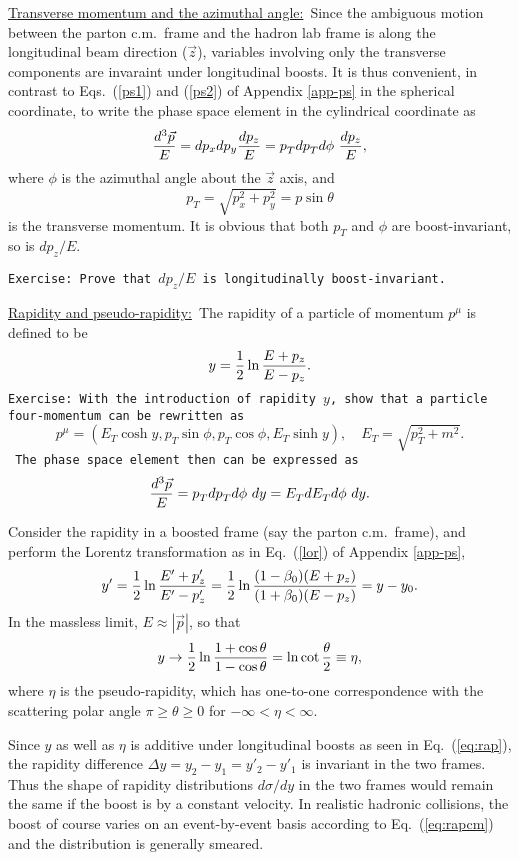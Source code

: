 \documentclass[prd,aps,floats,preprintnumbers,preprint,superscriptaddress,floatfix,nofootinbib]{revtex4}
\def\vp{{\vec p}}
\def\pt{p_T^{}}
\def\et{E_T^{}}
\def\be{\begin{equation}}
\def\ee{\end{equation}}
\begin{document}
\vskip 0.2cm
\noindent
\underline{Transverse momentum and the azimuthal angle:}\  Since the 
ambiguous motion between the parton c.m.~frame and the 
hadron lab frame is along
the longitudinal beam direction ($\vec z$), variables involving only
the transverse components are invaraint under longitudinal  boosts. It is thus
convenient, in contrast to Eqs.~(\ref{ps1})  and (\ref{ps2}) of Appendix \ref{app-ps} 
in the spherical coordinate,
 to write the phase space element in the cylindrical coordinate as
\be
{d^3\vec p\over E} = d p_x d p_y {d p_z\over E}  =  \pt d\pt d\phi\  {d p_z\over E} ,
\ee
where $\phi$ is the azimuthal angle about the $\vec z$ axis, and 
\be
\pt = \sqrt{p_x^2 + p_y^2} = p \sin\theta
\ee
 is the transverse momentum. It is obvious
that both $\pt$ and $\phi$ are  boost-invariant, so is $dp_z/E$.

\noindent
{\tt Exercise: Prove that $dp_z/E$ is longitudinally boost-invariant.}


\vskip 0.2cm
\noindent
\underline{Rapidity and pseudo-rapidity:}\  The rapidity of  a particle of momentum
$p^\mu$ is defined to be
\be
y = {1\over 2} \ln{E+p_z \over E - p_z }.
\ee
{\tt Exercise: With the introduction of  rapidity $y$, show that a particle 
four-momentum can be rewritten as 
\be
p^\mu=(E_T \cosh y, \pt \sin\phi, \pt \cos \phi, E_T\sinh y),\quad \et=\sqrt{p_T^2+m^2} .
\ee
The phase space element then can be expressed as
\be
{d^3\vec p\over E}  =  \pt d\pt d\phi\  dy =  \et d\et d\phi\  dy.
\ee  }

Consider the rapidity in a boosted frame (say the parton c.m.~frame), and
perform the Lorentz transformation as in Eq.~(\ref{lor}) of 
Appendix \ref{app-ps},
\be
y' = {1\over 2} \ln{E'+p'_z \over E' - p'_z } = 
{1\over 2}\ln{(1-\beta_0) (E+p_z) \over (1+\beta_0)(E - p_z) } = y - y_0.
\label{eq:rap}
\ee
In the massless limit, $E\approx |\vp|$, so that 
\be
y \to  {1\over 2} \ln{1+\cos\theta \over 1 - \cos\theta }= \ln{\cot {\theta \over 2} } \equiv \eta ,
\ee
where $\eta$ is the pseudo-rapidity, which has one-to-one correspondence with
the scattering polar angle $\pi \ge \theta\ge 0$ for $-\infty < \eta < \infty$. 

Since $y$ as well as $\eta$ is additive under longitudinal boosts as seen in 
Eq.~(\ref{eq:rap}), the rapidity difference 
$\Delta y= y_2 - y_1 = y'_2 - y'_1$ is invariant in the two frames. Thus the shape 
of  rapidity distributions $d\sigma/dy$ 
in the two frames would remain the same
if the boost is by a constant velocity. In realistic hadronic collisions, the boost
 of course varies on an event-by-event basis according to Eq.~(\ref{eq:rapcm})
 and the distribution is generally  smeared.
\end{document}
